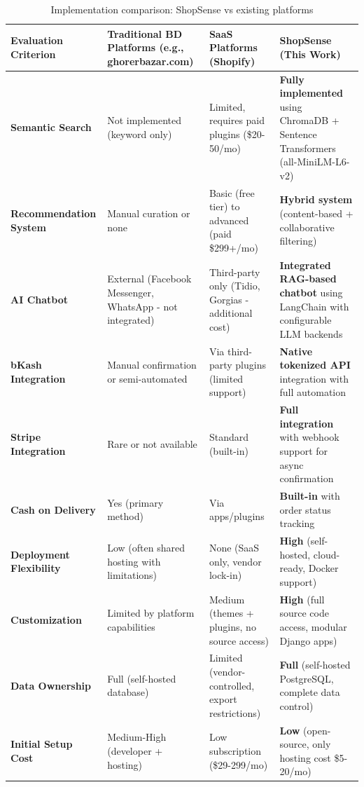 \begin{table}[H]
\centering
\caption{Implementation comparison: ShopSense vs existing platforms}
\label{tab:system-comparison}
\small
\begin{tabular}{|p{2.8cm}|p{3cm}|p{3cm}|p{3.8cm}|}
\hline
\textbf{Evaluation Criterion} & \textbf{Traditional BD Platforms (e.g., ghorerbazar.com)} & \textbf{SaaS Platforms (Shopify)} & \textbf{ShopSense (This Work)} \\
\hline
\textbf{Semantic Search} & Not implemented (keyword only) & Limited, requires paid plugins (\$20-50/mo) & \textbf{Fully implemented} using ChromaDB + Sentence Transformers (all-MiniLM-L6-v2) \\
\hline
\textbf{Recommendation System} & Manual curation or none & Basic (free tier) to advanced (paid \$299+/mo) & \textbf{Hybrid system} (content-based + collaborative filtering) \\
\hline
\textbf{AI Chatbot} & External (Facebook Messenger, WhatsApp - not integrated) & Third-party only (Tidio, Gorgias - additional cost) & \textbf{Integrated RAG-based chatbot} using LangChain with configurable LLM backends \\
\hline
\textbf{bKash Integration} & Manual confirmation or semi-automated & Via third-party plugins (limited support) & \textbf{Native tokenized API} integration with full automation \\
\hline
\textbf{Stripe Integration} & Rare or not available & Standard (built-in) & \textbf{Full integration} with webhook support for async confirmation \\
\hline
\textbf{Cash on Delivery} & Yes (primary method) & Via apps/plugins & \textbf{Built-in} with order status tracking \\
\hline
\textbf{Deployment Flexibility} & Low (often shared hosting with limitations) & None (SaaS only, vendor lock-in) & \textbf{High} (self-hosted, cloud-ready, Docker support) \\
\hline
\textbf{Customization} & Limited by platform capabilities & Medium (themes + plugins, no source access) & \textbf{High} (full source code access, modular Django apps) \\
\hline
\textbf{Data Ownership} & Full (self-hosted database) & Limited (vendor-controlled, export restrictions) & \textbf{Full} (self-hosted PostgreSQL, complete data control) \\
\hline
\textbf{Initial Setup Cost} & Medium-High (developer + hosting) & Low subscription (\$29-299/mo) & \textbf{Low} (open-source, only hosting cost \$5-20/mo) \\

\end{tabular}
\end{table}
